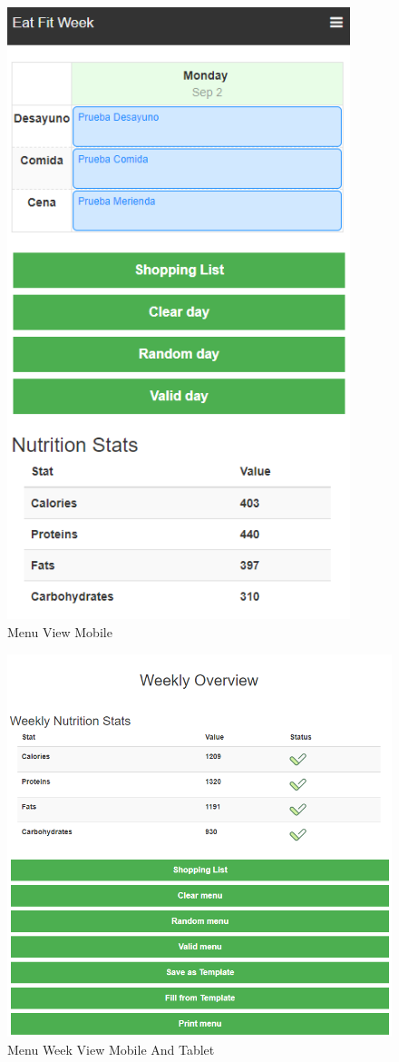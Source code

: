 \documentclass[12pt, a4paper, twoside]{book}
\begin{document}
	\begin{figure}[H]
		\centering
		\includegraphics[width=10cm]{Imagenes/MU-MenuViewMobile.png}
		\caption{Menu View Mobile}\label{Menu View Mobile}
	\end{figure}
	\begin{figure}[H]
		\centering
		\includegraphics[width=15cm]{Imagenes/MU-MenuWeekViewMobileTablet.png}
		\caption{Menu Week View Mobile And Tablet}\label{Menu Week View Mobile And Tablet}
	\end{figure}
	
\end{document}
